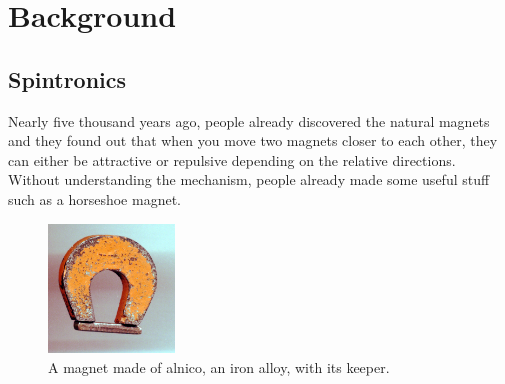 \chapter{Background}

\section{Spintronics}


Nearly five thousand years ago, people already discovered the natural magnets and they found out that when you move two magnets closer to each other, they can either be attractive or repulsive depending on the relative directions. Without understanding the mechanism, people already made some useful stuff such as a horseshoe magnet\cite{wiki:Ferromagnetism}.

\begin{figure}[!ht]
	\centering
	\includegraphics[width=0.3\textwidth]{fig/Magnet.jpg}
	\caption{A magnet made of alnico, an iron alloy, with its keeper.}\label{fig:Magnet}
\end{figure}




